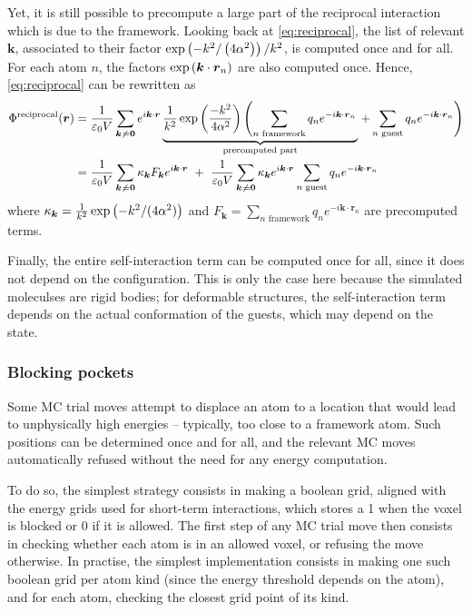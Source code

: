\documentclass[main.tex]{subfiles}
\begin{document}
Yet, it is still possible to precompute a large part of the reciprocal interaction which is due to the framework. Looking back at \autoref{eq:reciprocal}, the list of relevant $\boldsymbol{k}$, associated to their factor $\exp\left(-k^2/\left(4\alpha^2\right)\right)/k^2$, is computed once and for all. For each atom $n$, the factors $\exp\left(\boldsymbol{k}\cdot\boldsymbol{r}_n\right)$ are also computed once. Hence, \autoref{eq:reciprocal} can be rewritten as
\[\begin{split}\Phi^\text{reciprocal}(\boldsymbol r) &= \frac{1}{\varepsilon_0V}\sum_{\boldsymbol k\neq \boldsymbol 0}e^{i\boldsymbol{k}\cdot\boldsymbol{r}}\underbrace{\frac1{k^2}\exp\paren{\frac{-k^2}{4\alpha^2}}\left(\sum_{n\text{ framework}} q_n e^{-i\boldsymbol k\cdot\boldsymbol r_n}\right.}_\text{precomputed part}\left. + \sum_{n\text{ guest}} q_n e^{-i\boldsymbol k\cdot\boldsymbol r_n}\right)
\\&= \frac1{\varepsilon_0V}\sum_{\boldsymbol k\neq \boldsymbol 0} \kappa_{\boldsymbol k} F_{\boldsymbol k} e^{i\boldsymbol{k}\cdot\boldsymbol{r}} \ +\  \frac1{\varepsilon_0V}\sum_{\boldsymbol k\neq \boldsymbol 0} \kappa_{\boldsymbol k} e^{i\boldsymbol{k}\cdot\boldsymbol{r}} \sum_{n\text{ guest}} q_n e^{-i\boldsymbol k\cdot\boldsymbol r_n}
\label{eq:reciprocal_decomposed}\end{split}\]
where $\kappa_{\boldsymbol k} = \frac1{k^2}\exp\left(-k^2/(4\alpha^2)\right)$ and $F_{\boldsymbol k} = \sum\limits_{n\text{ framework}} q_n e^{-i\boldsymbol k\cdot\boldsymbol r_n}$ are precomputed terms.

Finally, the entire self-interaction term can be computed once for all, since it does not depend on the configuration. This is only the case here because the simulated moleculses are rigid bodies; for deformable structures, the self-interaction term depends on the actual conformation of the guests, which may depend on the state.

\subsubsection{Blocking pockets}

Some MC trial moves attempt to displace an atom to a location that would lead to unphysically high energies -- typically, too close to a framework atom. Such positions can be determined once and for all, and the relevant MC moves automatically refused without the need for any energy computation.

To do so, the simplest strategy consists in making a boolean grid, aligned with the energy grids used for short-term interactions, which stores a 1 when the voxel is blocked or 0 if it is allowed. The first step of any MC trial move then consists in checking whether each atom is in an allowed voxel, or refusing the move otherwise. In practise, the simplest implementation consists in making one such boolean grid per atom kind (since the energy threshold depends on the atom), and for each atom, checking the closest grid point of its kind.
\end{document}
